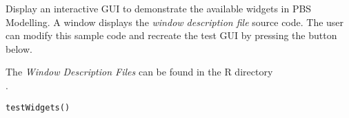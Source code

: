 \documentclass[letterpaper]{book}
\begin{document}
\begin{Description}\relax
Display an interactive GUI to demonstrate the available widgets in PBS Modelling.
A  window displays the \emph{window description file} source code. The user
can modify this sample code and recreate the test GUI by pressing the button below.

The \emph{Window Description Files} can be found in the R directory \\
.
\end{Description}
\begin{Usage}
\begin{verbatim}testWidgets()\end{verbatim}
\end{Usage}
\end{document}
